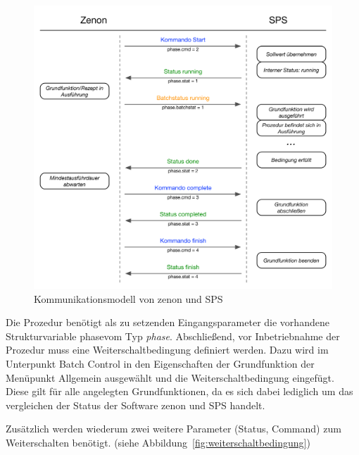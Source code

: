 \begin{figure}[h!]
  \centering
  \includegraphics[width=1\textwidth]{graphics/implementation/StateMachine.jpg}
  \caption{Kommunikationsmodell von zenon und \ac{SPS} \space \cite{demo_zenonbatch}}
  \label{fig:statemachine}
\end{figure}

	Die Prozedur benötigt als zu setzenden Eingangsparameter die vorhandene Strukturvariable \glqq phase\grqq \space vom Typ \textit{phase}. Abschließend, vor Inbetriebnahme der Prozedur muss eine Weiterschaltbedingung definiert werden. Dazu wird im Unterpunkt Batch Control in den Eigenschaften der Grundfunktion der Menüpunkt Allgemein ausgewählt und die Weiterschaltbedingung eingefügt. Diese gilt für alle angelegten Grundfunktionen, da es sich dabei lediglich um das vergleichen der Status der Software zenon und \ac{SPS} handelt.


	
	Zusätzlich werden wiederum zwei weitere Parameter (Status, Command) zum Weiterschalten benötigt. (siehe Abbildung~\ref{fig:weiterschaltbedingung})\\
	

